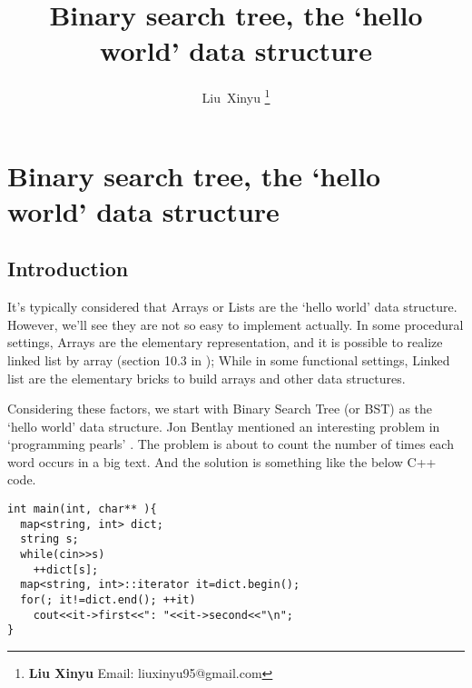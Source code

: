 \documentclass{article}
\begin{document}
\fi


\title{Binary search tree, the `hello world' data structure}

\author{Liu~Xinyu
\thanks{{\bfseries Liu Xinyu } \newline
  Email: liuxinyu95@gmail.com \newline}
  }


\maketitle

\ifx\wholebook\relax
\chapter{Binary search tree, the `hello world' data structure}
\fi

\section{Introduction}
\label{introduction}

It's typically considered that Arrays or Lists are the `hello world' data structure.
However, we'll see they are not so easy to implement actually. In some procedural 
settings, Arrays are the elementary representation, and it is possible to realize
linked list by array (section 10.3 in \cite{CLRS}); While in some functional settings,
Linked list are the elementary bricks to build arrays and other data structures.

Considering these factors, we start with Binary Search Tree (or BST) as the `hello world'
data structure. Jon Bentlay mentioned an interesting problem in `programming pearls'
\cite{Bentley}. The problem is about to count the number of times each word occurs
in a big text. And the solution is something like the below C++ code.

\lstset{language=C++}
\begin{lstlisting}
int main(int, char** ){
  map<string, int> dict;
  string s;
  while(cin>>s)
    ++dict[s];
  map<string, int>::iterator it=dict.begin();
  for(; it!=dict.end(); ++it)
    cout<<it->first<<": "<<it->second<<"\n";
}
\end{lstlisting}
\end{document}
